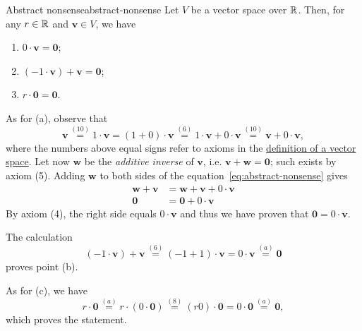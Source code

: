 \begin{lemma}{Abstract nonsense}{abstract-nonsense}
 Let $V$ be a vector space over $\mathbb{R}$. Then, for any $r \in \mathbb{R}$ and
 $\mathbf{v} \in V$, we have
 \begin{enumerate}[label=(\alph*)]
  \item $0 \cdot \mathbf{v} = \mathbf{0}$;
  \item $(-1 \cdot \mathbf{v}) + \mathbf{v} = \mathbf{0}$;
  \item $r \cdot \mathbf{0} = \mathbf{0}$.
 \end{enumerate}
\end{lemma}
\begin{lemproof}
 As for (a), observe that
 \begin{equation}
  \label{eq:abstract-nonsense}
  \mathbf{v} \overset{(10)}{=} 1 \cdot \mathbf{v} = (1 + 0) \cdot \mathbf{v}
  \overset{(6)}{=} 1 \cdot \mathbf{v} + 0 \cdot \mathbf{v} \overset{(10)}{=}
  \mathbf{v} + 0 \cdot \mathbf{v}, 
 \end{equation}
 where the numbers above equal signs refer to axioms in the
 \hyperref[def:abstract-vector-space]{definition of a vector space}. Let now
 $\mathbf{w}$ be the \emph{additive inverse} of $\mathbf{v}$, i.e. $\mathbf{v} +
 \mathbf{w} = \mathbf{0}$; such exists by axiom (5). Adding $\mathbf{w}$ to both
 sides of the equation~\eqref{eq:abstract-nonsense} gives
 \begin{align*}
  \mathbf{w} + \mathbf{v} &= \mathbf{w} + \mathbf{v} + 0 \cdot \mathbf{v}\\
  \mathbf{0} &= \mathbf{0} + 0 \cdot \mathbf{v}
 \end{align*}
 By axiom (4), the right side equals $0 \cdot \mathbf{v}$ and thus we have
 proven that $\mathbf{0} = 0 \cdot \mathbf{v}$.

 The calculation
 \[
  (-1 \cdot \mathbf{v}) + \mathbf{v} \overset{(6)}{=} (-1 + 1) \cdot \mathbf{v}
  = 0 \cdot \mathbf{v} \overset{(a)}{=} \mathbf{0}
 \]
 proves point (b).

 As for (c), we have
 \[
  r \cdot \mathbf{0} \overset{(a)}{=} r \cdot (0 \cdot \mathbf{0})
  \overset{(8)}{=} (r 0) \cdot \mathbf{0} = 0 \cdot \mathbf{0} \overset{(a)}{=}
  \mathbf{0},
 \]
 which proves the statement.
\end{lemproof}



